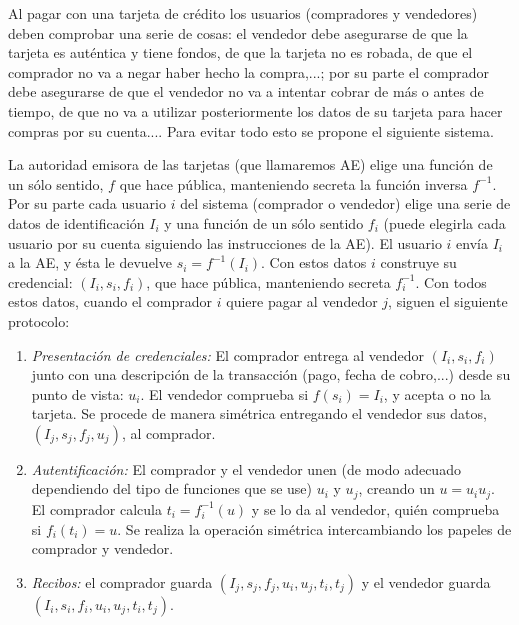 \begin{problem}[3]

Al pagar con una tarjeta de crédito los usuarios (compradores y
vendedores)
 deben comprobar una serie de cosas: el vendedor debe asegurarse de que
la tarjeta es auténtica y tiene fondos, de que la tarjeta no es
robada, de que el comprador no va a negar haber hecho la
compra,...; por su parte el comprador debe asegurarse de que el
vendedor no va a intentar cobrar de más o antes de tiempo, de que
no va a utilizar posteriormente los datos de su tarjeta para hacer
compras por su cuenta.... Para evitar todo esto se propone el
siguiente sistema.

La autoridad emisora de las tarjetas (que llamaremos AE) elige una
función de un sólo sentido, $f$ que hace pública, manteniendo
secreta la función inversa $f^{-1}$. Por su parte cada usuario $i$
del sistema (comprador o vendedor) elige una serie de datos de
identificación $I_i$ y una función de un sólo sentido $f_i$ (puede
elegirla cada usuario por su cuenta siguiendo las instrucciones de
la AE). El usuario $i$ envía $I_i$ a la AE, y ésta le devuelve
$s_i=f^{-1}(I_i)$. Con estos datos $i$ construye su credencial:
$(I_i, s_i,f_i)$, que hace pública, manteniendo secreta
$f_i^{-1}$. Con todos estos datos, cuando el comprador $i$ quiere
pagar al vendedor $j$, siguen el siguiente protocolo:

\begin{enumerate}
\item {\it Presentación de credenciales:} El comprador entrega al
vendedor $(I_i, s_i,f_i)$ junto con una descripción de la
transacción (pago, fecha de cobro,...) desde su punto de vista:
$u_i$. El vendedor comprueba si $f(s_i)=I_i$, y acepta o no la
tarjeta. Se procede de manera simétrica entregando el vendedor sus
datos,  $(I_j, s_j,f_j,u_j)$, al comprador.

\item {\it Autentificación:} El comprador y el vendedor unen (de
modo adecuado dependiendo del tipo de funciones que se use) $u_i$
y $u_j$, creando un $u=u_iu_j$. El comprador calcula
$t_i=f_i^{-1}(u)$ y se lo da al vendedor, quién comprueba si
$f_i(t_i)=u$. Se realiza la operación simétrica intercambiando los
papeles de comprador y vendedor.

\item {\it Recibos:} el comprador guarda $(I_j,
s_j,f_j,u_i,u_j,t_i,t_j)$ y el vendedor guarda $(I_i,
s_i,f_i,u_i,u_j,t_i,t_j)$.
\end{enumerate}


\end{problem}
